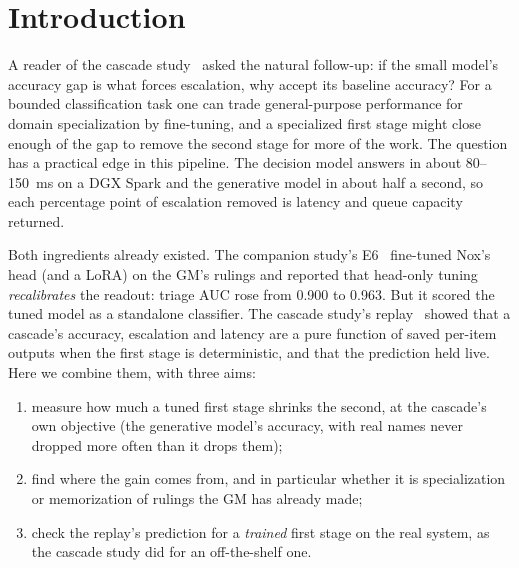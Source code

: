 \documentclass[11pt]{article}
\begin{document}
\section{Introduction}

A reader of the cascade study~\cite{cascade} asked the natural follow-up: if the small model's
accuracy gap is what forces escalation, why accept its baseline accuracy? For a bounded
classification task one can trade general-purpose performance for domain specialization by
fine-tuning, and a specialized first stage might close enough of the gap to remove the second stage
for more of the work. The question has a practical edge in this pipeline. The decision model answers
in about 80--150~ms on a DGX Spark and the generative model in about half a second, so each
percentage point of escalation removed is latency and queue capacity returned.

Both ingredients already existed. The companion study's E6~\cite{companion} fine-tuned Nox's head
(and a LoRA) on the GM's rulings and reported that head-only tuning \emph{recalibrates} the readout:
triage AUC rose from 0.900 to 0.963. But it scored the tuned model as a standalone classifier. The
cascade study's replay~\cite{cascade} showed that a cascade's accuracy, escalation and latency are a
pure function of saved per-item outputs when the first stage is deterministic, and that the
prediction held live. Here we combine them, with three aims:
\begin{enumerate}
  \item measure how much a tuned first stage shrinks the second, at the cascade's own objective
        (the generative model's accuracy, with real names never dropped more often than it drops them);
  \item find where the gain comes from, and in particular whether it is specialization or
        memorization of rulings the GM has already made;
  \item check the replay's prediction for a \emph{trained} first stage on the real system, as the
        cascade study did for an off-the-shelf one.
\end{enumerate}
\end{document}
